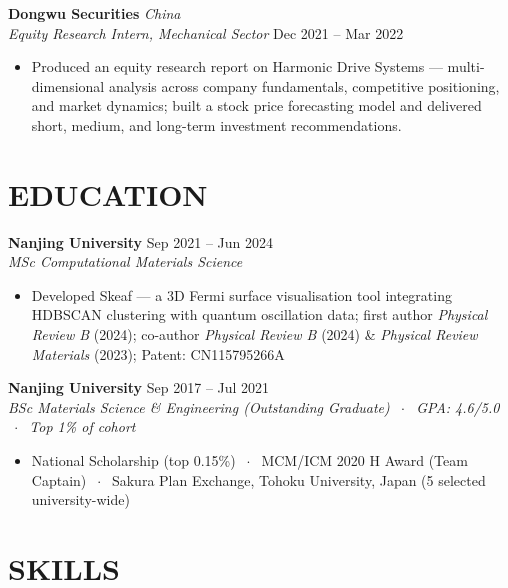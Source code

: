 \documentclass[a4paper,9pt]{article}
\begin{document}
\vspace{2pt}
\noindent\textbf{Dongwu Securities} \hfill \textit{China}\\
\textit{Equity Research Intern, Mechanical Sector} \hfill Dec 2021 -- Mar 2022
\begin{itemize}
    \item Produced an equity research report on Harmonic Drive Systems --- multi-dimensional analysis across company fundamentals, competitive positioning, and market dynamics; built a stock price forecasting model and delivered short, medium, and long-term investment recommendations.
\end{itemize}

\section{EDUCATION}

\noindent\textbf{Nanjing University} \hfill Sep 2021 -- Jun 2024\\
\textit{MSc Computational Materials Science}
\begin{itemize}
    \item Developed Skeaf --- a 3D Fermi surface visualisation tool integrating HDBSCAN clustering with quantum oscillation data; first author \textit{Physical Review B} (2024); co-author \textit{Physical Review B} (2024) \& \textit{Physical Review Materials} (2023); Patent: CN115795266A
\end{itemize}

\vspace{2pt}
\noindent\textbf{Nanjing University} \hfill Sep 2017 -- Jul 2021\\
\textit{BSc Materials Science \& Engineering (Outstanding Graduate) $\;\cdot\;$ GPA: 4.6/5.0 $\;\cdot\;$ Top 1\% of cohort}
\begin{itemize}
    \item National Scholarship (top 0.15\%) $\;\cdot\;$ MCM/ICM 2020 H Award (Team Captain) $\;\cdot\;$ Sakura Plan Exchange, Tohoku University, Japan (5 selected university-wide)
\end{itemize}

\section{SKILLS}
\end{document}
